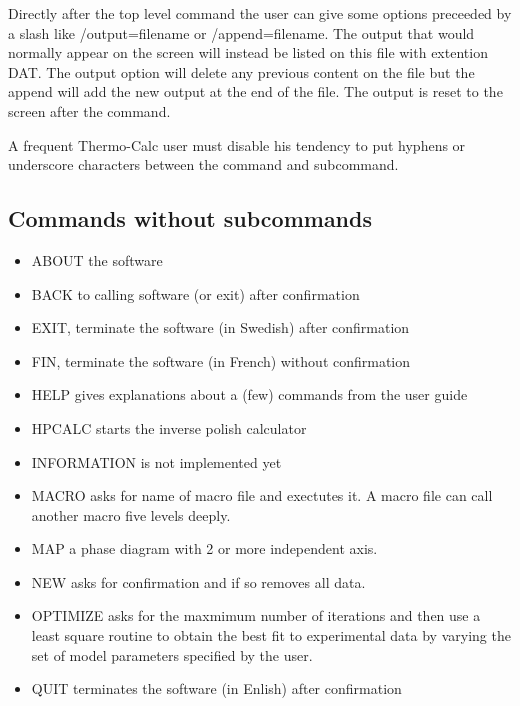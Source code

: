 \documentclass[12pt]{article}
\begin{document}
Directly after the top level command the user can give some options
preceeded by a slash like /output=filename or /append=filename.  The
output that would normally appear on the screen will instead be listed
on this file with extention DAT.  The output option will delete any
previous content on the file but the append will add the new output at
the end of the file.  The output is reset to the screen after the
command.

A frequent Thermo-Calc user must disable his tendency to put hyphens
or underscore characters between the command and subcommand.

\subsection{Commands without subcommands}

\begin{itemize}
\item ABOUT the software
\item BACK to calling software (or exit) after confirmation
\item EXIT, terminate the software (in Swedish) after confirmation
\item FIN, terminate the software (in French) without confirmation
\item HELP gives explanations about a (few) commands from the user guide
\item HPCALC starts the inverse polish calculator
\item INFORMATION is not implemented yet
\item MACRO asks for name of macro file and exectutes it.  A macro
  file can call another macro five levels deeply.
\item MAP a phase diagram with 2 or more independent axis.
\item NEW asks for confirmation and if so removes all data.
\item OPTIMIZE asks for the maxmimum number of iterations and then use
  a least square routine to obtain the best fit to experimental data
  by varying the set of model parameters specified by the user.
\item QUIT terminates the software (in Enlish) after confirmation
\end{itemize}
\end{document}
